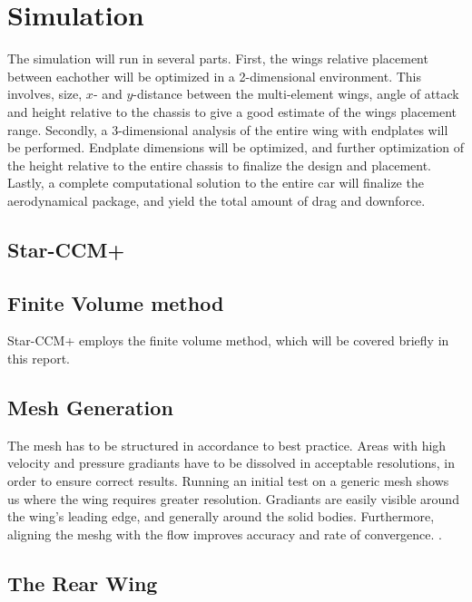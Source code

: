 \chapter{Simulation}

The simulation will run in several parts. First, the wings relative placement between eachother will be optimized in a 2-dimensional environment. This involves, size, $x$- and $y$-distance between the multi-element wings, angle of attack and height relative to the chassis to give a good estimate of the wings placement range. Secondly, a 3-dimensional analysis of the entire wing with endplates will be performed. Endplate dimensions will be optimized, and further optimization of the height relative to the entire chassis to finalize the design and placement. Lastly, a complete computational solution to the entire car will finalize the aerodynamical package, and yield the total amount of drag and downforce.

\section{Star-CCM+}

\section{Finite Volume method}

Star-CCM+ employs the finite volume method, which will be covered briefly in this report.

\section{Mesh Generation}

The mesh has to be structured in accordance to best practice. Areas with high velocity and pressure gradiants have to be dissolved in acceptable resolutions, in order to ensure correct results. Running an initial test on a generic mesh shows us where the wing requires greater resolution. Gradiants are easily visible around the wing's leading edge, and generally around the solid bodies. Furthermore, aligning the meshg with the flow improves accuracy and rate of convergence. .

\section{The Rear Wing}

